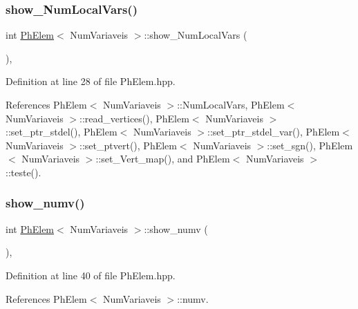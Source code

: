 \subsubsection{\texorpdfstring{show\+\_\+\+Num\+Local\+Vars()}{show\_NumLocalVars()}}
{\footnotesize\ttfamily int \hyperlink{classPhElem}{Ph\+Elem}$<$ Num\+Variaveis $>$\+::show\+\_\+\+Num\+Local\+Vars (\begin{DoxyParamCaption}{ }\end{DoxyParamCaption})\hspace{0.3cm}{\ttfamily [inline]}, {\ttfamily [inherited]}}



Definition at line 28 of file Ph\+Elem.\+hpp.



References Ph\+Elem$<$ Num\+Variaveis $>$\+::\+Num\+Local\+Vars, Ph\+Elem$<$ Num\+Variaveis $>$\+::read\+\_\+vertices(), Ph\+Elem$<$ Num\+Variaveis $>$\+::set\+\_\+ptr\+\_\+stdel(), Ph\+Elem$<$ Num\+Variaveis $>$\+::set\+\_\+ptr\+\_\+stdel\+\_\+var(), Ph\+Elem$<$ Num\+Variaveis $>$\+::set\+\_\+ptvert(), Ph\+Elem$<$ Num\+Variaveis $>$\+::set\+\_\+sgn(), Ph\+Elem$<$ Num\+Variaveis $>$\+::set\+\_\+\+Vert\+\_\+map(), and Ph\+Elem$<$ Num\+Variaveis $>$\+::teste().

\mbox{\label{classPhElem_a69a5cfc5b3b7faa4ad5f584311406ce1}} 
\subsubsection{\texorpdfstring{show\+\_\+numv()}{show\_numv()}}
{\footnotesize\ttfamily int \hyperlink{classPhElem}{Ph\+Elem}$<$ Num\+Variaveis $>$\+::show\+\_\+numv (\begin{DoxyParamCaption}{ }\end{DoxyParamCaption})\hspace{0.3cm}{\ttfamily [inline]}, {\ttfamily [inherited]}}



Definition at line 40 of file Ph\+Elem.\+hpp.



References Ph\+Elem$<$ Num\+Variaveis $>$\+::numv.

\mbox{\label{classPhElem_a7a476e9682accd03064f3e8bec39fb50}} 

